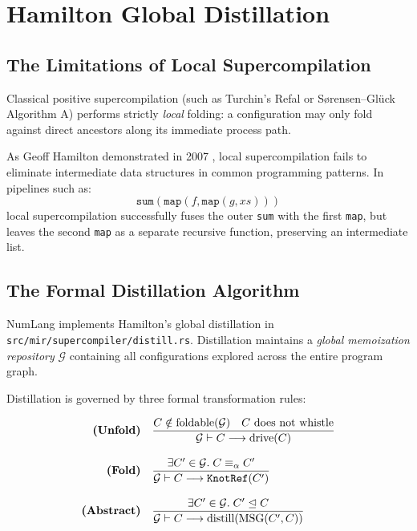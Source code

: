 \chapter{Hamilton Global Distillation}
\label{chap:distillation}

\section{The Limitations of Local Supercompilation}
\label{sec:distillation:limitations}

Classical positive supercompilation (such as Turchin's Refal or S\o{}rensen--Gl\"uck Algorithm A) performs strictly \emph{local} folding: a configuration may only fold against direct ancestors along its immediate process path. 

As Geoff Hamilton demonstrated in 2007 \citep{hamilton2007distillation}, local supercompilation fails to eliminate intermediate data structures in common programming patterns. In pipelines such as:
\begin{equation}
\mathtt{sum}(\mathtt{map}(f, \mathtt{map}(g, xs)))
\end{equation}
local supercompilation successfully fuses the outer \texttt{sum} with the first \texttt{map}, but leaves the second \texttt{map} as a separate recursive function, preserving an intermediate list.

\section{The Formal Distillation Algorithm}
\label{sec:distillation:algorithm}

NumLang implements Hamilton's global distillation in \texttt{src/mir/supercompiler/distill.rs}. Distillation maintains a \emph{global memoization repository} $\mathcal{G}$ containing all configurations explored across the entire program graph.

Distillation is governed by three formal transformation rules:

\begin{align}
\text{\bf (Unfold)} \quad & \frac{C \notin \text{foldable}(\mathcal{G}) \quad C \text{ does not whistle}}{\mathcal{G} \vdash C \longrightarrow \text{drive}(C)} \\[0.8em]
\text{\bf (Fold)} \quad & \frac{\exists C' \in \mathcal{G}.\; C \equiv_\alpha C'}{\mathcal{G} \vdash C \longrightarrow \mathtt{KnotRef}(C')} \\[0.8em]
\text{\bf (Abstract)} \quad & \frac{\exists C' \in \mathcal{G}.\; C' \trianglelefteq C}{\mathcal{G} \vdash C \longrightarrow \text{distill}(\text{MSG}(C', C))}
\end{align}

